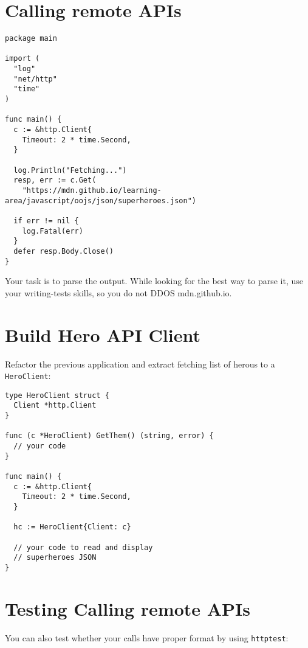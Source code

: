 \documentclass[11pt, letterpaper]{article}
\begin{document}
\section{Calling remote APIs}

\begin{verbatim}
package main

import (
  "log"
  "net/http"
  "time"
)

func main() {
  c := &http.Client{
    Timeout: 2 * time.Second,
  }

  log.Println("Fetching...")
  resp, err := c.Get(
    "https://mdn.github.io/learning-area/javascript/oojs/json/superheroes.json")

  if err != nil {
    log.Fatal(err)
  }
  defer resp.Body.Close()
}
\end{verbatim}

Your task is to parse the output. While looking for the best way to parse it, use your writing-tests skills, so you do not DDOS mdn.github.io.

\section{Build Hero API Client}

Refactor the previous application and extract fetching list of herous to a \verb|HeroClient|:

\begin{verbatim}
type HeroClient struct {
  Client *http.Client
}

func (c *HeroClient) GetThem() (string, error) {
  // your code
}

func main() {
  c := &http.Client{
    Timeout: 2 * time.Second,
  }

  hc := HeroClient{Client: c}
  
  // your code to read and display 
  // superheroes JSON
}
\end{verbatim}

\section{Testing Calling remote APIs}

You can also test whether your calls have proper format by using \texttt{httptest}:
\end{document}
